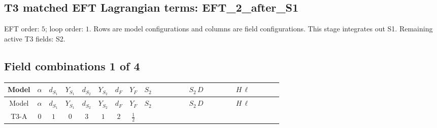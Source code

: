 \documentclass[8pt]{article}
\begin{document}
\begin{landscape}
\section*{T3 matched EFT Lagrangian terms: EFT\_2\_after\_S1}
EFT order: $5$; loop order: $1$. 
Rows are model configurations and columns are field configurations. This stage integrates out S1. Remaining active T3 fields: S2.
\tiny
\subsection*{Field combinations 1 of 4}
\begin{longtable}{@{}cccccccc >{\raggedright\arraybackslash}p{0.21\linewidth} >{\raggedright\arraybackslash}p{0.21\linewidth} >{\raggedright\arraybackslash}p{0.21\linewidth}@{}}
\toprule
Model & $\alpha$ & $d_{S_1}$ & $Y_{S_1}$ & $d_{S_2}$ & $Y_{S_2}$ & $d_F$ & $Y_F$ & $S_2$ & $S_2\,D$ & $H\,\ell$ \\
\midrule
\endfirsthead
\toprule
Model & $\alpha$ & $d_{S_1}$ & $Y_{S_1}$ & $d_{S_2}$ & $Y_{S_2}$ & $d_F$ & $Y_F$ & $S_2$ & $S_2\,D$ & $H\,\ell$ \\
\midrule
\endhead
T3-A & $0$ & $1$ & $0$ & $3$ & $1$ & $2$ & $\frac{1}{2}$ & \scriptsize\adjustbox{max width=\linewidth}{$\begin{gathered} -S_{2,j_1} S_{2,j_1}{}^{\dagger } M_{S_2}^2 \\ +\frac{2 \hbar  \overline{y_{2,i_1,r_1}} \overline{y_{2,i_2,r_2}} S_{2,j_2}^2 y_{2,i_1,r_2} y_{2,i_2,r_1} \left(S_{2,j_1}{}^{\dagger }\right){}^2}{3 \epsilon } \\ -\frac{C_{S_2^\dagger S_2} \hbar  \overline{y_{2,i_1,r_1}} S_{2,j_1} y_{2,i_1,r_1} S_{2,j_1}{}^{\dagger }}{\sqrt{3}}\end{gathered}$} & \scriptsize\adjustbox{max width=\linewidth}{$\begin{gathered} +D_{\mu _1}\left(S_{2,j_1}\right){}^{\dagger } D_{\mu _1}\left(S_{2,j_1}\right)\end{gathered}$} & \scriptsize\adjustbox{max width=\linewidth}{$\begin{gathered} +\frac{2 \hbar  \overline{y_{1,i_1,r_1}} \overline{y_{2,i_2,r_1}} L_{a_4,i_2}{}^T\, C\, P_L\, L_{a_2,i_1} H_{a_1} H_{a_3} \lambda_{T3} \epsilon_{a_1,a_2} \epsilon_{a_3,a_4}}{\sqrt{3} \epsilon  M_F} \\ +\frac{2 \hbar  \overline{y_{1,i_1,r_1}} \overline{y_{2,i_2,r_1}} L_{a_4,i_2}{}^T\, C\, P_L\, L_{a_2,i_1} H_{a_1} H_{a_3} \lambda_{T3} \epsilon_{a_1,a_2} \epsilon_{a_3,a_4}}{\sqrt{3} M_F} \\ +\frac{2 \hbar  \overline{\lambda_{T3}} \overline{L_{a_3,i_1}}\, C\, P_R\, \overline{L_{a_4,i_2}}{}^T y_{1,i_1,r_1} y_{2,i_2,r_1} \epsilon_{a_1,a_3} \epsilon_{a_2,a_4} H_{a_1}{}^{\dagger } H_{a_2}{}^{\dagger }}{\sqrt{3} \epsilon  M_F}\end{gathered}$} \\

\end{longtable}
\end{landscape}
\end{document}
